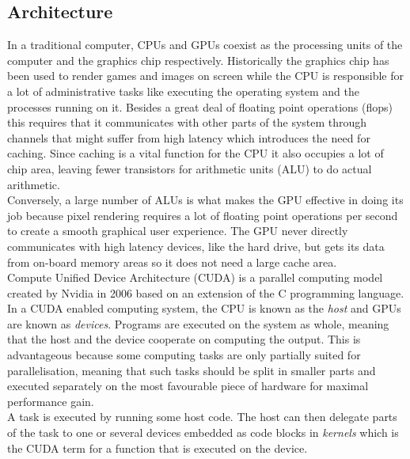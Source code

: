 
\subsection{Architecture}
In a traditional computer, CPUs and GPUs coexist as the processing units of the computer and the graphics chip respectively. Historically the graphics chip has been used to render games and images on screen while the CPU is responsible for a lot of administrative tasks like executing the operating system and the processes running on it. Besides a great deal of floating point operations (flops) this requires that it communicates with other parts of the system through channels that might suffer from high latency which introduces the need for caching. Since caching is a vital function for the CPU it also occupies a lot of chip area, leaving fewer transistors for arithmetic units (ALU) to do actual arithmetic. \\

Conversely, a large number of ALUs is what makes the GPU effective in doing its job because pixel rendering requires a lot of floating point operations per second to create a smooth graphical user experience. The GPU never directly communicates with high latency devices, like the hard drive, but gets its data from on-board memory areas so it does not need a large cache area.\\

Compute Unified Device Architecture (CUDA) is a parallel computing model created by Nvidia in 2006 based on an extension of the C programming language. In a CUDA enabled computing system, the CPU is known as the \emph{host} and GPUs are known as \emph{devices}. Programs are executed on the system as whole, meaning that the host and the device cooperate on computing the output. This is advantageous because some computing tasks are only partially suited for parallelisation, meaning that such tasks should be split in smaller parts and executed separately on the most favourable piece of hardware for maximal performance gain. \\

A task is executed by running some host code. The host can then delegate parts of the task to one or several devices embedded as code blocks in \emph{kernels} which is the CUDA term for a function that is executed on the device.\\

